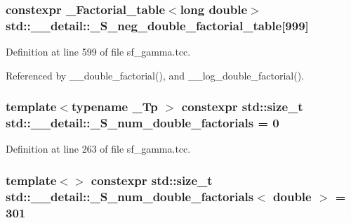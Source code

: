 \subsubsection[{\texorpdfstring{\+\_\+\+S\+\_\+neg\+\_\+double\+\_\+factorial\+\_\+table}{_S_neg_double_factorial_table}}]{\setlength{\rightskip}{0pt plus 5cm}constexpr {\bf \+\_\+\+Factorial\+\_\+table}$<$long double$>$ std\+::\+\_\+\+\_\+detail\+::\+\_\+\+S\+\_\+neg\+\_\+double\+\_\+factorial\+\_\+table\mbox{[}999\mbox{]}}\hypertarget{namespacestd_1_1____detail_adb3fbe0d6f7c40b02e479b63d547f57c}{}\label{namespacestd_1_1____detail_adb3fbe0d6f7c40b02e479b63d547f57c}


Definition at line 599 of file sf\+\_\+gamma.\+tcc.



Referenced by \+\_\+\+\_\+double\+\_\+factorial(), and \+\_\+\+\_\+log\+\_\+double\+\_\+factorial().

\subsubsection[{\texorpdfstring{\+\_\+\+S\+\_\+num\+\_\+double\+\_\+factorials}{_S_num_double_factorials}}]{\setlength{\rightskip}{0pt plus 5cm}template$<$typename \+\_\+\+Tp $>$ constexpr std\+::size\+\_\+t std\+::\+\_\+\+\_\+detail\+::\+\_\+\+S\+\_\+num\+\_\+double\+\_\+factorials = 0}\hypertarget{namespacestd_1_1____detail_a762f5ed905d1f926bfd8b16f8ea2c568}{}\label{namespacestd_1_1____detail_a762f5ed905d1f926bfd8b16f8ea2c568}


Definition at line 263 of file sf\+\_\+gamma.\+tcc.

\subsubsection[{\texorpdfstring{\+\_\+\+S\+\_\+num\+\_\+double\+\_\+factorials$<$ double $>$}{_S_num_double_factorials< double >}}]{\setlength{\rightskip}{0pt plus 5cm}template$<$$>$ constexpr std\+::size\+\_\+t {\bf std\+::\+\_\+\+\_\+detail\+::\+\_\+\+S\+\_\+num\+\_\+double\+\_\+factorials}$<$ double $>$ = 301}\hypertarget{namespacestd_1_1____detail_ae829eb6434a90060ee0650f1c71fb92d}{}\label{namespacestd_1_1____detail_ae829eb6434a90060ee0650f1c71fb92d}


